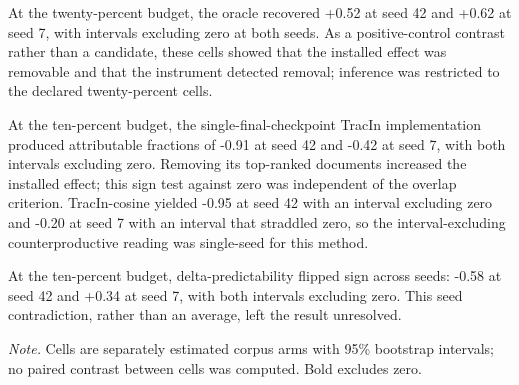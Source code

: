 \documentclass[10pt]{article}
\begin{document}
At the twenty-percent budget, the oracle recovered +0.52 at seed 42 and +0.62 at seed 7, with intervals excluding zero at both seeds. As a positive-control contrast rather than a candidate, these cells showed that the installed effect was removable and that the instrument detected removal; inference was restricted to the declared twenty-percent cells.



At the ten-percent budget, the single-final-checkpoint TracIn implementation produced attributable fractions of -0.91 at seed 42 and -0.42 at seed 7, with both intervals excluding zero. Removing its top-ranked documents increased the installed effect; this sign test against zero was independent of the overlap criterion. TracIn-cosine yielded -0.95 at seed 42 with an interval excluding zero and -0.20 at seed 7 with an interval that straddled zero, so the interval-excluding counterproductive reading was single-seed for this method.



At the ten-percent budget, delta-predictability flipped sign across seeds: -0.58 at seed 42 and +0.34 at seed 7, with both intervals excluding zero. This seed contradiction, rather than an average, left the result unresolved.





\begin{table}[H]
\centering
\footnotesize
\caption{ Installed effect across the length by premise-density factorial corpus arms, with rows for document length and columns for premise density. Each cell reports the separately estimated effect with its 95\% interval. Source: paper/synthesis.json. }
\label{tab:factorial_2x2}


\par\footnotesize\emph{Note.} Cells are separately estimated corpus arms with 95\% bootstrap intervals; no paired contrast between cells was computed. Bold excludes zero.
\end{table}
\end{document}
